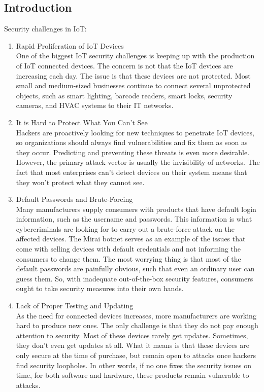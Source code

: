 \documentclass[12pt]{article}
\begin{document}
 \subsection{Introduction}
 Security challenges in IoT:
 \begin{enumerate}
 	\item Rapid Proliferation of IoT Devices\\
 	One of the biggest IoT security challenges is keeping up with the production of IoT connected devices. The concern is not that the IoT devices are increasing each day. The issue is that these devices are not protected. Most small and medium-sized businesses continue to connect several unprotected objects, such as smart lighting,
 	barcode readers, smart locks, security cameras, and HVAC systems to their IT networks.
 	\item It is Hard to Protect What You Can’t See\\
 	Hackers are proactively looking for new techniques to penetrate IoT devices, so organizations should always find vulnerabilities and fix them as soon as they occur. Predicting and preventing these threats is even more desirable. However, the primary attack vector is usually the invisibility of networks. The fact that most enterprises can’t detect devices on their system means that they won’t protect what they cannot see.
 	\item Default Passwords and Brute-Forcing\\
 	Many manufacturers supply consumers with products that have default login information, such as the username and passwords. This information is what cybercriminals are looking for to carry out a brute-force attack on the affected devices. The Mirai botnet serves as an example of the issues that come with selling devices with default credentials and not informing the consumers to change them. The most worrying thing is that most of the default passwords are painfully obvious, such that even an ordinary user can guess them. So, with inadequate out-of-the-box security features, consumers ought to take security measures into their own hands.
 	\item Lack of Proper Testing and Updating\\
 	As the need for connected devices increases, more manufacturers are working hard to produce new ones. The only challenge is that they do not pay enough attention to security. Most of these devices rarely get updates. Sometimes, they don’t even get updates at all. What it means is that these devices are only secure at the time of purchase, but remain open to attacks once hackers find security loopholes. In other words, if no one fixes the security issues on time, for both software and hardware, these products remain vulnerable to attacks.

\end{enumerate}
\end{document}
